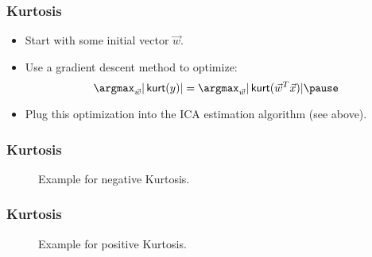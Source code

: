\begin{frame}
  \frametitle{Kurtosis \cont}

  
  \begin{itemize}
    \item Start with some initial vector $\vec w$. \pause
    \item Use a gradient descent method to optimize:
      \begin{displaymath}
        \argmax_{\vec w} | \kurt (y) | = \argmax_{\vec{w}} | \kurt(\vec w^T \vec x) | \pause
      \end{displaymath}
    \item Plug this optimization into the ICA estimation algorithm (see above).
  \end{itemize}
\end{frame}


\begin{frame}
  \frametitle{Kurtosis \cont}


  \begin{figure}
    \centering
    \resizebox{\linewidth}{!}{    
      \resizebox{.3\linewidth}{!}{    
        
      }
      \resizebox{.4\linewidth}{!}{    
        \quad
        
      }
    }
    \caption{\footnotesize Example for negative Kurtosis.}
  \end{figure}
\end{frame}


\begin{frame}
  \frametitle{Kurtosis \cont}

  
  \begin{figure}
    \centering
    \resizebox{.9\linewidth}{!}{    
      \resizebox{.3\linewidth}{!}{    
        
      }
      \resizebox{.43\linewidth}{!}{    
        \quad
        
      }
    }
    \caption{\footnotesize Example for positive Kurtosis.}
  \end{figure}
\end{frame}


